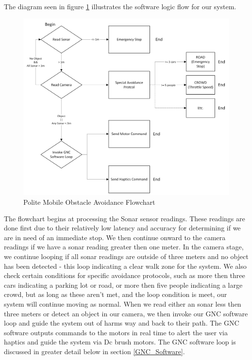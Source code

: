 \noindent The diagram seen in figure \ref{fig:Polite-Mobile-Obstacle-Avoidance-Flowchart} illustrates the software logic flow for our system. \\

\begin{figure}[H]
	\centering
	\includegraphics[width=1.0\textwidth]{./Images/Polite-Mobile-Obstacle-Avoidance-Flowchart.png}
	\caption{\label{fig:Polite-Mobile-Obstacle-Avoidance-Flowchart}Polite Mobile Obstacle Avoidance Flowchart}
\end{figure}

\noindent The flowchart begins at processing the Sonar sensor readings. These readings are done first due to their relatively low latency and accuracy for determining if we are in need of an immediate stop. We then continue onward to the camera readings if we have a sonar reading greater then one meter. In the camera stage, we continue looping if all sonar readings are outside of three meters and no object has been detected - this loop indicating a clear walk zone for the system. We also check certain conditions for specific avoidance protocols, such as more then three cars indicating a parking lot or road, or more then five people indicating a large crowd, but as long as these aren't met, and the loop condition is meet, our system will continue moving as normal. When we read either an sonar less then three meters or detect an object in our camera, we then invoke our GNC software loop and guide the system out of harms way and back to their path. The GNC software outputs commands to the motors in real time to alert the user via haptics and guide the system via Dc brush motors. The GNC software loop is discussed in greater detail below in section \ref{GNC_Software}. \\


